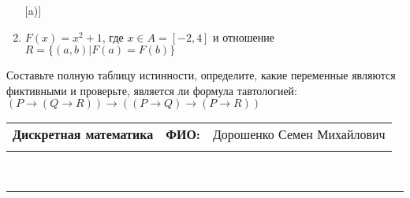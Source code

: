 \documentclass[10pt]{exam}
\newcommand{\class}{Дискретная математика}
\newcommand{\examdate}{}
\begin{document}
\begin{questions}
\begin{enumerate} [a)]
\item $F(x)=x^{2}+1$, где $x \in A = [-2, 4]$ и отношение $R = \{(a,b)|F(a) = F(b)\}$
\end{enumerate}\question Составьте полную таблицу истинности, определите, какие переменные являются фиктивными и проверьте, является ли формула тавтологией:
$(P \rightarrow (Q \rightarrow R)) \rightarrow ((P \rightarrow Q) \rightarrow (P \rightarrow R))$

\end{questions}
\newpage
\begin{flushright}
\begin{tabular}{p{2.8in} r l}
\textbf{\class} & \textbf{ФИО:} &Дорошенко Семен Михайлович
\\

\textbf{\examdate} &&\\
\end{tabular}\\
\end{flushright}
\rule[1ex]{\textwidth}{.1pt}
\end{document}
